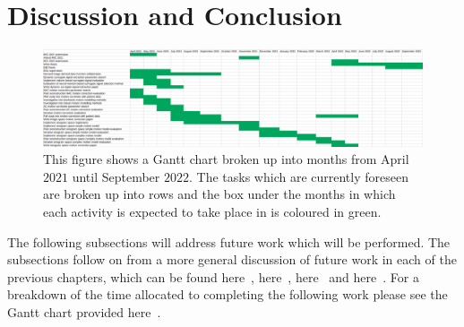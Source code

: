 \chapter{Discussion and Conclusion} \label{sec:discussion_and_conclusion}
    \newpage
    
        
    
        \begin{figure}
            \centering
                
            \includegraphics[width=1.0\linewidth]{figures/future_work_gantt_chart.png}
                
            \captionsetup{singlelinecheck=false, justification=centering}
            \caption{This figure shows a Gantt chart broken up into months from April $2021$ until September $2022$. The tasks which are currently foreseen are broken up into rows and the box under the months in which each activity is expected to take place in is coloured in green.}
            \label{fig:future_work_gantt_chart}
        \end{figure}
        
        The following subsections will address future work which will be performed. The subsections follow on from a more general discussion of future work in each of the previous chapters, which can be found here~, here~, here~ and here~. For a breakdown of the time allocated to completing the following work please see the Gantt chart provided here~.
        
